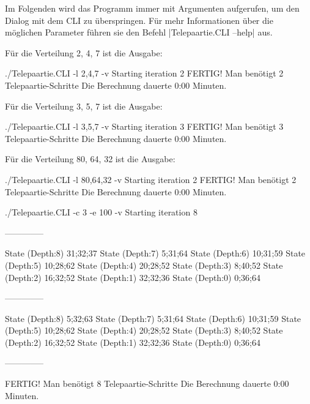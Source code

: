 \documentclass[a4paper,10pt,ngerman]{scrartcl}
\begin{document}
Im Folgenden wird das Programm immer mit Argumenten aufgerufen, um den Dialog mit dem CLI zu überspringen. Für mehr Informationen über die möglichen Parameter führen sie den Befehl |Telepaartie.CLI --help| aus.

Für die Verteilung 2, 4, 7 ist die Ausgabe:
\begin{lstcs}
./Telepaartie.CLI -l 2,4,7 -v
Starting iteration 2
FERTIG!
Man benötigt 2 Telepaartie-Schritte
Die Berechnung dauerte 0:00 Minuten.
\end{lstcs}
Für die Verteilung 3, 5, 7 ist die Ausgabe:
\begin{lstcs}
./Telepaartie.CLI -l 3,5,7 -v
Starting iteration 3
FERTIG!
Man benötigt 3 Telepaartie-Schritte
Die Berechnung dauerte 0:00 Minuten.
\end{lstcs}
Für die Verteilung 80, 64, 32 ist die Ausgabe:
\begin{lstcs}
./Telepaartie.CLI -l 80,64,32 -v
Starting iteration 2
FERTIG!
Man benötigt 2 Telepaartie-Schritte
Die Berechnung dauerte 0:00 Minuten.
\end{lstcs}
\begin{lstcs}
./Telepaartie.CLI -c 3 -e 100 -v
Starting iteration 8

--------------

State (Depth:8) {31;32;37}
State (Depth:7) {5;31;64}
State (Depth:6) {10;31;59}
State (Depth:5) {10;28;62}
State (Depth:4) {20;28;52}
State (Depth:3) {8;40;52}
State (Depth:2) {16;32;52}
State (Depth:1) {32;32;36}
State (Depth:0) {0;36;64}

--------------

State (Depth:8) {5;32;63}
State (Depth:7) {5;31;64}
State (Depth:6) {10;31;59}
State (Depth:5) {10;28;62}
State (Depth:4) {20;28;52}
State (Depth:3) {8;40;52}
State (Depth:2) {16;32;52}
State (Depth:1) {32;32;36}
State (Depth:0) {0;36;64}

--------------


FERTIG!
Man benötigt 8 Telepaartie-Schritte
Die Berechnung dauerte 0:00 Minuten.
\end{lstcs}
\end{document}
